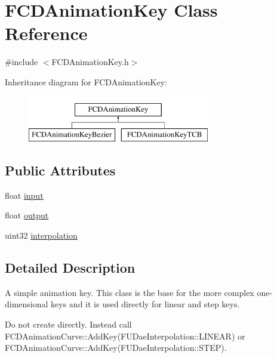 \hypertarget{classFCDAnimationKey}{
\section{FCDAnimationKey Class Reference}
\label{classFCDAnimationKey}
}


{\ttfamily \#include $<$FCDAnimationKey.h$>$}

Inheritance diagram for FCDAnimationKey:\begin{figure}[H]
\begin{center}
\leavevmode
\includegraphics[height=2.000000cm]{classFCDAnimationKey}
\end{center}
\end{figure}
\subsection*{Public Attributes}
\begin{DoxyCompactItemize}
\item 
float \hyperlink{classFCDAnimationKey_a1591f4d28aac7dff40d92b0308809a7f}{input}
\item 
float \hyperlink{classFCDAnimationKey_aa779e0e946f47dbc9a2d6b9eeb58d6c2}{output}
\item 
uint32 \hyperlink{classFCDAnimationKey_a09ea6034885bc7a3c8af91afa68a52ed}{interpolation}
\end{DoxyCompactItemize}


\subsection{Detailed Description}
A simple animation key. This class is the base for the more complex one-\/dimensional keys and it is used directly for linear and step keys.

Do not create directly. Instead call FCDAnimationCurve::AddKey(FUDaeInterpolation::LINEAR) or FCDAnimationCurve::AddKey(FUDaeInterpolation::STEP). 

